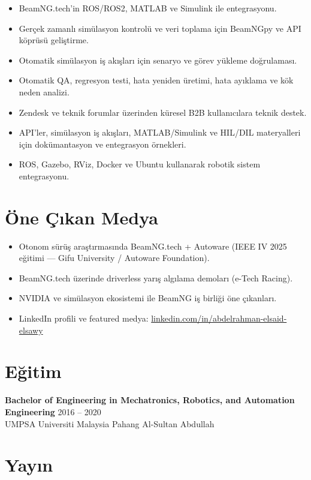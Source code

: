 \documentclass[11pt,a4paper]{article}
\begin{document}
\begin{itemize}
    \item BeamNG.tech'in ROS/ROS2, MATLAB ve Simulink ile entegrasyonu.
    \item Gerçek zamanlı simülasyon kontrolü ve veri toplama için BeamNGpy ve API köprüsü geliştirme.
    \item Otomatik simülasyon iş akışları için senaryo ve görev yükleme doğrulaması.
    \item Otomatik QA, regresyon testi, hata yeniden üretimi, hata ayıklama ve kök neden analizi.
    \item Zendesk ve teknik forumlar üzerinden küresel B2B kullanıcılara teknik destek.
    \item API'ler, simülasyon iş akışları, MATLAB/Simulink ve HIL/DIL materyalleri için dokümantasyon ve entegrasyon örnekleri.
    \item ROS, Gazebo, RViz, Docker ve Ubuntu kullanarak robotik sistem entegrasyonu.
\end{itemize}

\section*{Öne Çıkan Medya}

\begin{itemize}
    \item Otonom sürüş araştırmasında BeamNG.tech + Autoware (IEEE IV 2025 eğitimi — Gifu University / Autoware Foundation).
    \item BeamNG.tech üzerinde driverless yarış algılama demoları (e-Tech Racing).
    \item NVIDIA ve simülasyon ekosistemi ile BeamNG iş birliği öne çıkanları.
    \item LinkedIn profili ve featured medya: \href{https://www.linkedin.com/in/abdelrahman-elsaid-elsawy}{linkedin.com/in/abdelrahman-elsaid-elsawy}
\end{itemize}

\section*{Eğitim}

\textbf{Bachelor of Engineering in Mechatronics, Robotics, and Automation Engineering}
\hfill 2016 -- 2020\\
UMPSA Universiti Malaysia Pahang Al-Sultan Abdullah

\section*{Yayın}
\end{document}
